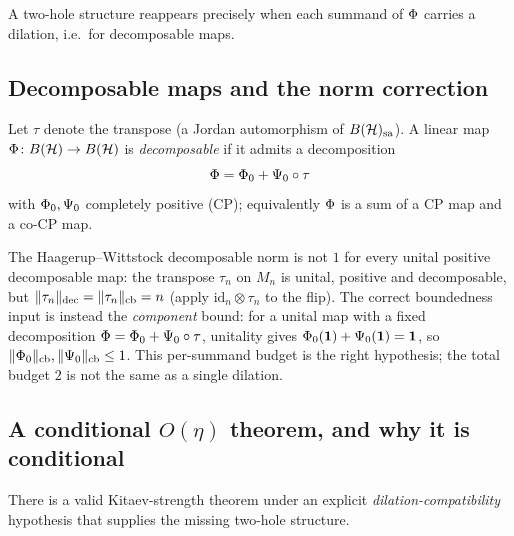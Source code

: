 A two-hole structure reappears precisely when each summand of $\Phi$ carries a
dilation, i.e.\ for decomposable maps.

\subsection{Decomposable maps and the norm correction}

\begin{definition}\label{def:decomposable}
Let $\tau$ denote the transpose (a Jordan automorphism of $B(\mathcal{H})_{\mathrm{sa}}$). A linear map
$\Phi\colon B(\mathcal{H})\to B(\mathcal{H})$ is \emph{decomposable} if it admits a
decomposition
\[
  \Phi=\Phi_0+\Psi_0\circ\tau
\]
with $\Phi_0,\Psi_0$ completely positive (CP); equivalently $\Phi$ is a
sum of a CP map and a co-CP map.
\end{definition}

\begin{proposition}
\label{prop:decomposable-norm}
The Haagerup--Wittstock decomposable norm is not $1$ for every unital positive
decomposable map: the transpose $\tau_n$ on $M_n$ is unital, positive and
decomposable, but $\lVert \tau_n \rVert_{\mathrm{dec}}=\lVert \tau_n \rVert_{\mathrm{cb}}=n$
(apply $\mathrm{id}_n\otimes\tau_n$ to the flip). The correct boundedness input
is instead the \emph{component} bound: for a unital map with a fixed
decomposition $\Phi=\Phi_0+\Psi_0\circ\tau$, unitality gives
$\Phi_0(\mathbf{1})+\Psi_0(\mathbf{1})=\mathbf{1}$, so $\lVert \Phi_0 \rVert_{\mathrm{cb}},
\lVert \Psi_0 \rVert_{\mathrm{cb}}\le1$. This per-summand budget is the right hypothesis;
the total budget $2$ is not the same as a single dilation.
\end{proposition}

\subsection{A conditional \texorpdfstring{$O(\eta)$}{O(eta)} theorem, and why it is conditional}

There is a valid Kitaev-strength theorem under an explicit \emph{dilation-compatibility}
hypothesis that supplies the missing two-hole structure.

